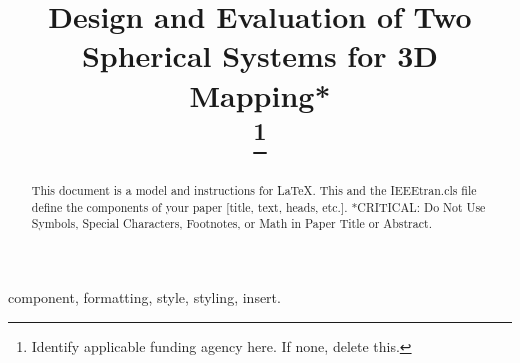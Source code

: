 \documentclass[conference]{IEEEtran}
\begin{document}
\title{Design and Evaluation of  Two Spherical Systems for 3D Mapping*\\

\thanks{Identify applicable funding agency here. If none, delete this.}
}

\author{
}

\maketitle

\begin{abstract}
This document is a model and instructions for \LaTeX.
This and the IEEEtran.cls file define the components of your paper [title, text, heads, etc.]. *CRITICAL: Do Not Use Symbols, Special Characters, Footnotes, 
or Math in Paper Title or Abstract.
\end{abstract}

\begin{IEEEkeywords}
component, formatting, style, styling, insert.
\end{IEEEkeywords}
\end{document}
